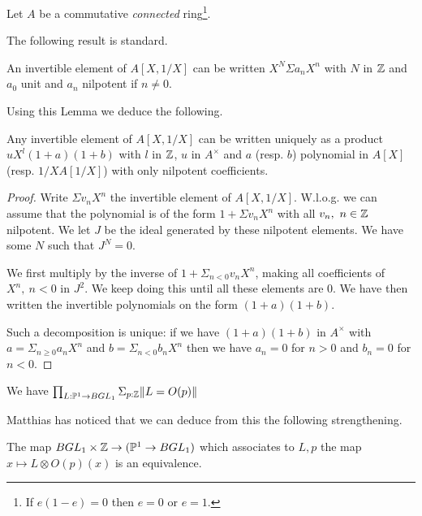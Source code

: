  Let $A$ be a commutative {\em connected} ring\footnote{If $e(1-e) = 0$ then $e=0$ or $e=1$.}.

The following result is standard.

 \begin{lemma}\label{stand}
   An invertible element of $A[X,1/X]$ can be written $X^N\Sigma a_nX^n$ with $N$ in $\mathbb{Z}$
   and $a_0$ unit and $a_n$ nilpotent if $n\neq 0$.
 \end{lemma}
 
 Using this Lemma we deduce the following.

\begin{lemma}\label{nilpotent}
  Any invertible element of $A[X,1/X]$ can be written uniquely as a product
  $uX^l(1+a)(1+b)$ with $l$ in $\mathbb{Z}$, $u$ in $A^{\times}$ and $a$ (resp. $b$)
  polynomial in $A[X]$ (resp. $1/XA[1/X]$) with only nilpotent coefficients.
\end{lemma}

\begin{proof}
  Write $\Sigma v_nX^n$ the invertible element of $A[X,1/X]$.
  W.l.o.g. we can assume that the polynomial is of the form $1 + \Sigma v_nX^n$ with
  all $v_n,~n\in \mathbb{Z}$ nilpotent.
  We let $J$ be the ideal generated by these nilpotent elements.
  We have some $N$ such that $J^N = 0$.
  
  We first multiply by the inverse of $1 + \Sigma_{n<0}v_nX^n$, making all coefficients of
  $X^n,~n<0$ in $J^2$.
  We keep doing this until all these elements are $0$.
  We have then written the invertible polynomials on the form $(1+a)(1+b)$.

  Such a decomposition is unique: if we have $(1+a)(1+b)$ in $A^{\times}$ with $a = \Sigma_{n\geqslant 0}a_nX^n$
  and $b = \Sigma_{n<0}b_nX^n$ then we have $a_n = 0$ for $n>0$ and $b_n = 0$ for $n<0$.
\end{proof}

\begin{corollary}\label{Pic1}
  We have $\prod_{L:\mathbb{P}^1\rightarrow BGL_1}\Sigma_{p:\mathbb{Z}}\|L = O(p)\|$
\end{corollary}

Matthias has noticed that we can deduce from this the following strengthening.

\begin{proposition}\label{Matthias}
  The map $BGL_1\times\mathbb{Z}\rightarrow (\mathbb{P}^1\rightarrow BGL_1)$
  which associates to $L,p$ the map $x\mapsto L\otimes O(p)(x)$ is an equivalence.
\end{proposition}

